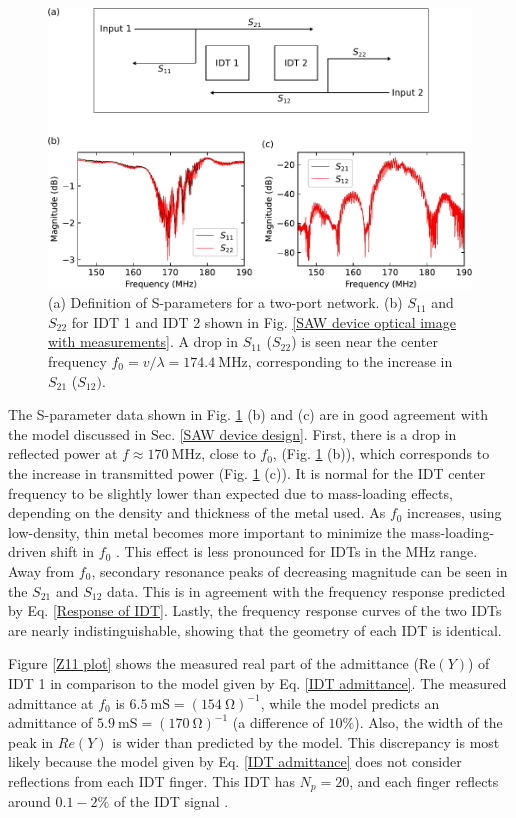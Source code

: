 \documentclass[double,12pt,1in]{beavtex}
\begin{document}
\begin{figure}
    \includegraphics[width = 1\textwidth]{S-parameters.pdf}
    \caption{(a) Definition of S-parameters for a two-port network. (b) $S_{11}$ and $S_{22}$ for IDT 1 and IDT 2 shown in Fig. \ref{SAW device optical image with measurements}. A drop in $S_{11}$ ($S_{22}$) is seen near the center frequency $f_0 = v/\lambda = \SI{174.4}{\mega\hertz}$, corresponding to the increase in $S_{21}$ ($S_{12})$.}
    \label{S-parameters}
\end{figure}
The S-parameter data shown in Fig. \ref{S-parameters} (b) and (c) are in good agreement with the model discussed in Sec. \ref{SAW device design}. First, there is a drop in reflected power at $f \approx \SI{170}{\mega\hertz}$, close to $f_0$, (Fig. \ref{S-parameters} (b)), which corresponds to the increase in transmitted power (Fig. \ref{S-parameters} (c)). It is normal for the IDT center frequency to be slightly lower than expected due to mass-loading effects, depending on the density and thickness of the metal used. As $f_0$ increases, using low-density, thin metal becomes more important to minimize the mass-loading-driven shift in $f_0$ \cite{chen_ultrahigh-frequency_2020}. This effect is less pronounced for IDTs in the MHz range. Away from $f_0$, secondary resonance peaks of decreasing magnitude can be seen in the $S_{21}$ and $S_{12}$ data. This is in agreement with the frequency response predicted by Eq. \ref{Response of IDT}. Lastly, the frequency response curves of the two IDTs are nearly indistinguishable, showing that the geometry of each IDT is identical. 

Figure \ref{Z11 plot} shows the measured real part of the admittance ($\mathrm{Re}(Y)$) of IDT 1 in comparison to the model given by Eq. \ref{IDT admittance}. The measured admittance at $f_0$ is $\SI{6.5}{\milli\siemens} = (\SI{154}{\ohm})^{-1}$, while the model predicts an admittance of $\SI{5.9}{\milli\siemens} = (\SI{170}{\ohm})^{-1}$ (a difference of $10\%$). Also, the width of the peak in $Re(Y)$ is wider than predicted by the model. This discrepancy is most likely because the model given by Eq. \ref{IDT admittance} does not consider reflections from each IDT finger. This IDT has $N_p = 20$, and each finger reflects around $0.1-2 \%$ of the IDT signal \cite[p. 140]{lane_integrating_2021}.
\end{document}
